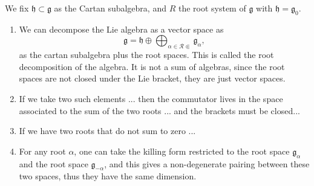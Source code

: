 \begin{theorem}
    We fix \(\mathfrak{h} \subset \mathfrak{g}\) as the Cartan subalgebra, and \(R\) the root system of \(\mathfrak{g}\) with \(\mathfrak{h} = \mathfrak{g}_0\).
    \begin{enumerate}[label=(\roman*)]
        \item We can decompose the Lie algebra as a vector space as
              \[
                  \mathfrak{g} = \mathfrak{h} \oplus \bigoplus_{\alpha \in \mathcal{R} \Subset} \mathfrak{g}_\alpha,
              \]
              as the cartan subalgebra plus the root spaces. This is called the root decomposition of the algebra. It is not a sum of algebras, since the root spaces are not closed under the Lie bracket, they are just vector spaces.
        \item If we take two such elements ... then the commutator lives in the space associated to the sum of the two roots ... and the brackets must be closed...
        \item If we have two roots that do not sum to zero ...
        \item For any root \(\alpha\), one can take the killing form restricted to the root space \(\mathfrak{g}_\alpha\) and the root space \(\mathfrak{g}_{-\alpha}\), and this gives a non-degenerate pairing between these two spaces, thus they have the same dimension.
    \end{enumerate}
\end{theorem}
